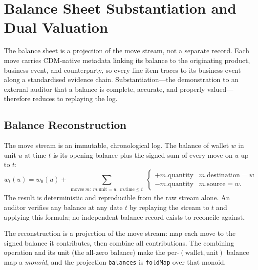 \section{Balance Sheet Substantiation and Dual Valuation}
\label{sec:sec10}\label{sec:substantiation}

The balance sheet is a projection of the move stream, not a separate record. Each move carries CDM-native metadata linking its balance to the originating product, business event, and counterparty, so every line item traces to its business event along a standardised evidence chain. Substantiation---the demonstration to an external auditor that a balance is complete, accurate, and properly valued---therefore reduces to replaying the log.

\subsection{Balance Reconstruction}

The move stream is an immutable, chronological log. The balance of wallet $w$ in unit $u$ at time $t$ is its opening balance plus the signed sum of every move on $u$ up to $t$:
\[
w_t(u) = w_0(u) + \sum_{\substack{\text{moves } m:\; m.\text{unit}=u,\; m.\text{time}\leq t}}
\begin{cases}
+m.\text{quantity} & m.\text{destination}=w \\
-m.\text{quantity} & m.\text{source}=w.
\end{cases}
\]
The result is deterministic and reproducible from the raw stream alone. An auditor verifies any balance at any date $t$ by replaying the stream to $t$ and applying this formula; no independent balance record exists to reconcile against.

The reconstruction is a projection of the move stream: map each move to the signed balance it contributes, then combine all contributions. The combining operation and its unit (the all-zero balance) make the per-$(\text{wallet},\text{unit})$ balance map a \emph{monoid}, and the projection \lstinline!balances! is \lstinline!foldMap! over that monoid.

